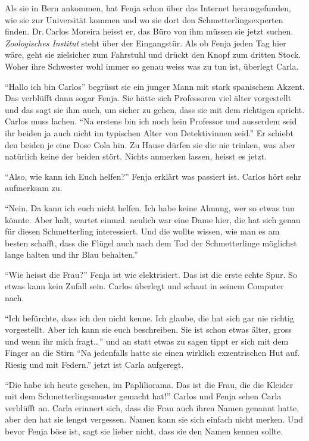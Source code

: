  Als sie in Bern ankommen, hat Fenja schon über das Internet herausgefunden, wie sie zur Universität kommen und wo sie dort den Schmetterlingsexperten finden. Dr.\,Carlos Moreira heisst er, das Büro von ihm müssen sie jetzt suchen. \emph{Zoologisches Institut} steht über der Eingangstür. Als ob Fenja jeden Tag hier wäre, geht sie zielsicher zum Fahrstuhl und drückt den Knopf zum dritten Stock. Woher ihre Schwester wohl immer so genau weiss was zu tun ist, überlegt Carla.

\enquote{Hallo ich bin Carlos} begrüsst sie ein junger Mann mit stark spanischem Akzent. Das verblüfft dann sogar Fenja. Sie hätte sich Professoren viel älter vorgestellt und das sagt sie ihm auch, um sicher zu gehen, dass sie mit dem richtigen spricht. Carlos muss lachen. \enquote{Na erstens bin ich noch kein Professor und ausserdem seid ihr beiden ja auch nicht im typischen Alter von Detektivinnen seid.} Er schiebt den beiden je eine Dose Cola hin. Zu Hause dürfen sie die nie trinken, was aber natürlich keine der beiden stört. Nichts anmerken lassen, heisst es jetzt.

\enquote{Also, wie kann ich Euch helfen?} Fenja erklärt was passiert ist. Carlos hört sehr aufmerksam zu.

\enquote{Nein. Da kann ich euch nicht helfen. Ich habe keine Ahnung, wer so etwas tun könnte. Aber halt, wartet einmal. neulich war eine Dame hier, die hat sich genau für diesen Schmetterling interessiert. Und die wollte wissen, wie man es am besten schafft, dass die Flügel auch nach dem Tod der Schmetterlinge möglichst lange halten und ihr Blau behalten.}

\enquote{Wie heisst die Frau?} Fenja ist wie elektrisiert. Das ist die erste echte Spur. So etwas kann kein Zufall sein. Carlos überlegt und schaut in seinem Computer nach.

\enquote{Ich befürchte, dass ich den nicht kenne. Ich glaube, die hat sich gar nie richtig vorgestellt. Aber ich kann sie euch beschreiben. Sie ist schon etwas älter, gross und wenn ihr mich fragt\dots} und an statt etwas zu sagen tippt er sich mit dem Finger an die Stirn \enquote{Na jedenfalls hatte sie einen wirklich exzentrischen Hut auf. Riesig und mit Federn.} jetzt ist Carla aufgeregt. 

\enquote{Die habe ich heute gesehen, im Papliliorama. Das ist die Frau, die die Kleider mit dem Schmetterlingsmuster gemacht hat!} Carlos und Fenja sehen Carla verblüfft an. Carla erinnert sich, dass die Frau auch ihren Namen genannt hatte, aber den hat sie lengst vergessen. Namen kann sie sich einfach nicht merken. Und bevor Fenja böse ist, sagt sie lieber nicht, dass sie den Namen kennen sollte.

